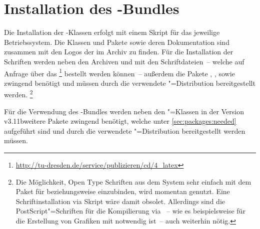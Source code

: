 \documentclass[%
  english,ngerman,%
  headings=optiontoheadandtoc,captions=tableheading,numbers=noenddot,%
  chapterpage,cdfoot,%
]{tudscrman}
\newcommand*\vKOMA{v3.11b}
\begin{document}
\section{Installation des \TUDScript-Bundles}
\label{sec:installation}
Die Installation der \TUDScript-Klassen erfolgt mit einem Skript für das 
jeweilige Betriebssystem. Die Klassen und Pakete sowie deren Dokumentation sind 
zusammen mit den Logos der \TnUD im Archiv  zu 
finden. Für die Installation der Schriften werden neben den Archiven 
 und  mit den 
Schriftdateien~-- welche auf Anfrage über das \CD%
\footnote{\url{http://tu-dresden.de/service/publizieren/cd/4_latex}} bestellt 
werden können~-- außerdem die Pakete , , 
 sowie  zwingend benötigt und müssen durch die 
verwendete "=Distribution bereitgestellt werden.%
\footnote{%
  Die Möglichkeit, Open Type Schriften aus dem System sehr einfach mit dem Paket
   für  beziehungsweise  
  einzubinden, wird momentan genutzt. Eine Schriftinstallation via Skript wäre 
  damit obsolet. Allerdings sind die PostScript"=Schriften für die Kompilierung 
  via ~-- wie es 
  beispielsweise für die Erstellung von Grafiken mit  
  notwendig ist~-- auch weiterhin nötig.
}

Für die Verwendung des \TUDScript-Bundles werden neben den \KOMAScript"=Klassen 
in der Version \vKOMA weitere Pakete zwingend benötigt, welche unter 
\autoref{sec:packages:needed} aufgeführt sind und durch die verwendete 
"=Distribution bereitgestellt werden müssen.
\end{document}
